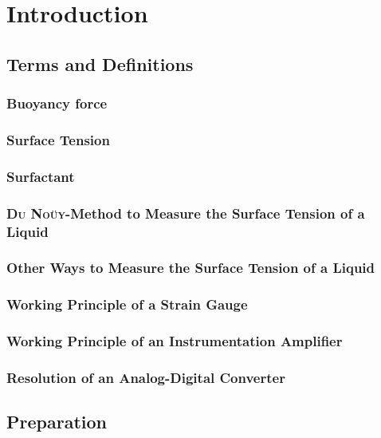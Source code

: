 \chapter{Introduction}
    \section{Terms and Definitions}
        \subsection*{Buoyancy force}\label{sec:Buoyancy force}
        \subsection*{Surface Tension}
        \subsection*{Surfactant}
        \subsection*{\textsc{Du Noüy}-Method to Measure the Surface Tension of a Liquid}
        \subsection*{Other Ways to Measure the Surface Tension of a Liquid}
        \subsection*{Working Principle of a Strain Gauge}
        \subsection*{Working Principle of an Instrumentation Amplifier}
        \subsection*{Resolution of an Analog-Digital Converter}
    \section{Preparation}
